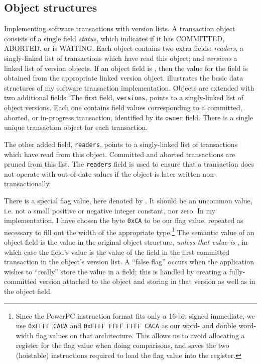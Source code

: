\subsection{Object structures}%
%
 {Implementing software transactions with version
  lists.  A transaction object consists of a single field {\it
    status}, which indicates if it has COMMITTED, ABORTED, or is WAITING.
  Each object contains two extra fields: {\it readers}, a
  singly-linked list of transactions which have read this object; and
  {\it versions} a linked list of version objects.  If an object field
  is \FLAG, then the value for the field is obtained from the
  appropriate linked version object.}
 illustrates the basic data structures of my
software transaction implementation.  Objects are extended with two
additional fields.  The first field, {\tt versions}, points to a
singly-linked list of object versions.  Each one contains field values
corresponding to a committed, aborted, or in-progress transaction,
identified by its {\tt owner} field.  There is a single unique
transaction object for each transaction.

The other added field, {\tt readers}, points to a singly-linked list
of transactions which have read from this object.  Committed and
aborted transactions are pruned from this list.  The {\tt readers}
field is used to ensure that a transaction does not operate with
out-of-date values if the object is later written
non-transactionally.

There is a special flag value, here denoted by \FLAG.  It should be
an uncommon value, i.e. not a small positive or negative integer
constant, nor zero.  In my implementation, I have chosen the byte
\texttt{0xCA} to be our flag value, repeated as necessary to fill out
the width of the appropriate type.\footnote{Since the PowerPC instruction
format fits only a 16-bit signed immediate, we use \texttt{0xFFFF CACA}
and \texttt{0xFFFF FFFF FFFF CACA} as our word- and double word-width flag
values on that architecture.  This allows us to avoid allocating a
register for the flag value when doing comparisons, and saves the two
(hoistable) instructions required to load the flag value into the register.}
The semantic value of an object field is the value in the original
object structure, \emph{unless that value is \FLAG}, in which
case the field's value is the value of the field in the first
committed transaction in the object's version list.  A ``false flag''
occurs when the application wishes to ``really'' store the value \FLAG
in a field; this is handled by creating a fully-committed version
attached to the object and storing \FLAG in that version as well as in
the object field.

